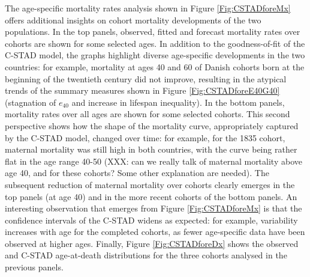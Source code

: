 \documentclass[11pt, a4paper]{article}
\begin{document}
The age-specific mortality rates analysis shown in Figure \ref{Fig:CSTADforeMx} offers additional insights on cohort mortality developments of the two populations. In the top panels, observed, fitted and forecast mortality rates over cohorts are shown for some selected ages. In addition to the goodness-of-fit of the C-STAD model, the graphs highlight diverse age-specific developments in the two countries: for example, mortality at ages 40 and 60 of Danish cohorts born at the beginning of the twentieth century did not improve, resulting in the atypical trends of the summary measures shown in Figure \ref{Fig:CSTADforeE40G40} (stagnation of $e_{40}$ and increase in lifespan inequality). In the bottom panels, mortality rates over all ages are shown for some selected cohorts. This second perspective shows how the shape of the mortality curve, appropriately captured by the C-STAD model, changed over time: for example, for the 1835 cohort, maternal mortality was still high in both countries, with the curve being rather flat in the age range 40-50 (XXX: can we really talk of maternal mortality above age 40, and for these cohorts? Some other explanation are needed). The subsequent reduction of maternal mortality over cohorts clearly emerges in the top panels (at age 40) and in the more recent cohorts of the bottom panels. An interesting observation that emerges from Figure \ref{Fig:CSTADforeMx} is that the confidence intervals of the C-STAD widens as expected: for example, variability increases with age for the completed cohorts, as fewer age-specific data have been observed at higher ages. Finally, Figure \ref{Fig:CSTADforeDx} shows the observed and C-STAD age-at-death distributions for the three cohorts analysed in the previous panels. 
\end{document}
